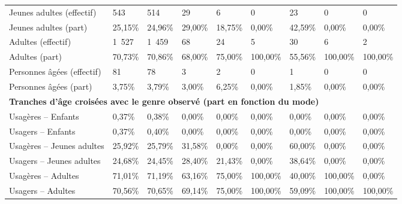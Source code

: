 \begin{longtable}{p{3.7cm}p{0.9cm}p{0.9cm}p{0.9cm}p{0.9cm}p{0.9cm}p{0.9cm}p{0.9cm}p{0.9cm}}
    \small{Jeunes adultes (effectif)} & \small{543} & \small{514} & \small{29} & \small{6} & \small{0} & \small{23} & \small{0} & \small{0}\\    
    \small{Jeunes adultes (part)} & \small{25,15\%} & \small{24,96\%} & \small{29,00\%} & \small{18,75\%} & \small{0,00\%} & \small{42,59\%} & \small{0,00\%} & \small{0,00\%}\\    
    \small{Adultes (effectif)} & \small{1~527} & \small{1~459} & \small{68} & \small{24} & \small{5} & \small{30} & \small{6} & \small{2}\\   
    \small{Adultes (part)} & \small{70,73\%} & \small{70,86\%} & \small{68,00\%} & \small{75,00\%} & \small{100,00\%} & \small{55,56\%} & \small{100,00\%} & \small{100,00\%}\\    
    \small{Personnes âgées (effectif)} & \small{81} & \small{78} & \small{3} & \small{2} & \small{0} & \small{1} & \small{0} & \small{0}\\    
    \small{Personnes âgées (part)} & \small{3,75\%} & \small{3,79\%} & \small{3,00\%} & \small{6,25\%} & \small{0,00\%} & \small{1,85\%} & \small{0,00\%} & \small{0,00\%}\\
    \hline
\multicolumn{9}{l}{\textbf{Tranches d'âge croisées avec le genre observé (part en fonction du mode)}}\\
    \small{Usagères – Enfants} & \small{0,37\%} & \small{0,38\%} & \small{0,00\%} & \small{0,00\%} & \small{0,00\%} & \small{0,00\%} & \small{0,00\%} & \small{0,00\%}\\    
    \small{Usagers – Enfants} & \small{0,37\%} & \small{0,40\%} & \small{0,00\%} & \small{0,00\%} & \small{0,00\%} & \small{0,00\%} & \small{0,00\%} & \small{0,00\%}\\    
    \small{Usagères – Jeunes adultes} & \small{25,92\%} & \small{25,79\%} & \small{31,58\%} & \small{0,00\%} & \small{0,00\%} & \small{60,00\%} & \small{0,00\%} & \small{0,00\%}\\    
    \small{Usagers – Jeunes adultes} & \small{24,68\%} & \small{24,45\%} & \small{28,40\%} & \small{21,43\%} & \small{0,00\%} & \small{38,64\%} & \small{0,00\%} & \small{0,00\%}\\    
    \small{Usagères – Adultes} & \small{71,01\%} & \small{71,19\%} & \small{63,16\%} & \small{75,00\%} & \small{100,00\%} & \small{40,00\%} & \small{100,00\%} & \small{0,00\%}\\
        \small{Usagers – Adultes} & \small{70,56\%} & \small{70,65\%} & \small{69,14\%} & \small{75,00\%} & \small{100,00\%} & \small{59,09\%} & \small{100,00\%} & \small{100,00\%}\\    

\end{longtable}
